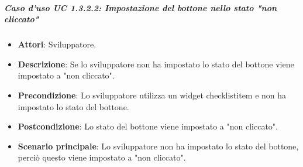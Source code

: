 \subparagraph{Caso d'uso UC 1.3.2.2: Impostazione del bottone nello stato "non cliccato"}
\label{UC 1.3.2.2: Impostazione del bottone nello stato "non cliccato"}

\FloatBarrier
\begin{itemize}
\item\textbf{Attori}: Sviluppatore.
\item\textbf{Descrizione}: Se lo sviluppatore non ha impostato lo stato del bottone viene impostato a "non cliccato".
\item\textbf{Precondizione}: Lo sviluppatore utilizza un widget checklistitem e non ha impostato lo stato del bottone.
\item\textbf{Postcondizione}: Lo stato del bottone viene impostato a "non cliccato".
\item\textbf{Scenario principale}: Lo sviluppatore non ha impostato lo stato del bottone, perciò questo viene impostato a "non cliccato".
\end{itemize}
